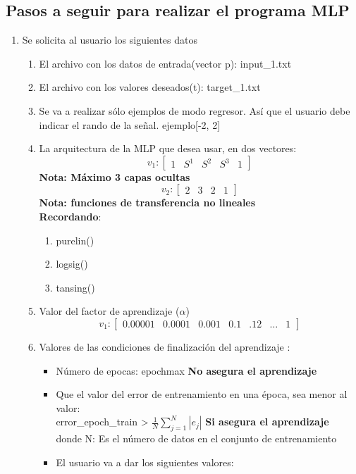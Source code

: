 \documentclass{article}
\begin{document}
\subsection{Pasos a seguir para realizar el programa MLP}
\begin{enumerate}
	\item Se solicita al usuario los siguientes datos
	\begin{enumerate}
		\item El archivo con los datos de entrada(vector p): input\_1.txt
		\item El archivo con los valores deseados(t): target\_1.txt
		\item Se va a realizar sólo ejemplos de modo regresor. Así que el usuario debe indicar el rando de la señal. ejemplo[-2, 2]
		\item La arquitectura de la MLP que desea usar, en dos vectores:
		\[v_1: 
		\begin{bmatrix}
		1 & S^1 & S^2 & S^3 & 1
		\end{bmatrix}
		\]
		\textbf{Nota: Máximo 3 capas ocultas}
		\[v_2: 
		\begin{bmatrix}
		2 & 3 & 2 & 1
		\end{bmatrix}
		\]
		\textbf{Nota: funciones de transferencia no lineales}\\
		\textbf{Recordando}:
		\begin{enumerate}
			\item purelin()
			\item logsig()
			\item tansing()
		\end{enumerate}
	\item Valor del factor de aprendizaje ($\alpha$)
	\[v_1: 
	\begin{bmatrix}
	0.00001 & 0.0001 & 0.001 & 0.1 & .12 & \dots & 1
	\end{bmatrix}
	\]
	\item Valores de las condiciones de finalización del aprendizaje :
	\begin{itemize}
		\item Número de epocas: epochmax \textbf{No asegura el aprendizaje}
		\item Que el valor del error de entrenamiento en una época, sea menor al valor:\\ error\_epoch\_train > $\frac{1}{N}\sum_{j=1}^{N}| e_j|$ \textbf{Si asegura el aprendizaje}\\
		donde N: Es el número de datos en el conjunto de entrenamiento
		\item El usuario va a dar los siguientes valores:

\end{itemize}
\end{enumerate}
\end{enumerate}
\end{document}
